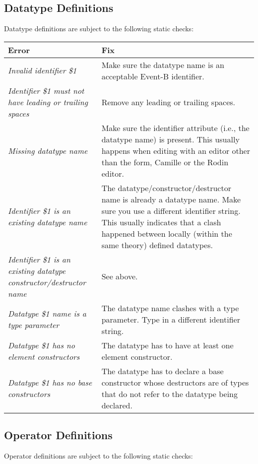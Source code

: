 \subsection{Datatype Definitions}
Datatype definitions are subject to the following static checks:
\begin{table}
	\begin{center}
		\begin{tabular}{|l|l|}
			\hline
			\textbf{Error} & \textbf{Fix}\\
			\hline
			\textit{Invalid identifier \$1} & Make sure the datatype name is an acceptable Event-B identifier.\\
			\hline
			\textit{Identifier \$1 must not have leading or trailing spaces} & Remove any leading or trailing spaces.\\
			\hline
			\textit{Missing datatype name} & Make sure the identifier attribute (i.e., the datatype name) is present. This usually happens when editing with an editor other than the form, Camille or the Rodin editor.\\
			\hline
			\textit{Identifier \$1 is an existing datatype name} & The datatype/constructor/destructor name is already a datatype name. Make sure you use a different identifier string. This usually indicates that a clash happened between locally (within the same theory) defined datatypes.\\
			\hline
			\textit{Identifier \$1 is an existing datatype constructor/destructor name} & See above.\\
			\hline
			\textit{Datatype \$1 name is a type parameter} & The datatype name clashes with a type parameter. Type in a different identifier string.\\
			\hline
			\textit{Datatype \$1 has no element constructors} & The datatype has to have at least one element constructor.\\
			\hline
			\textit{Datatype \$1 has no base constructors} & The datatype has to declare a base constructor whose destructors are of types that do not refer to the datatype being declared.\\
			\hline
		\end{tabular}
	\end{center}
\end{table}


\subsection{Operator Definitions}
Operator definitions are subject to the following static checks:


